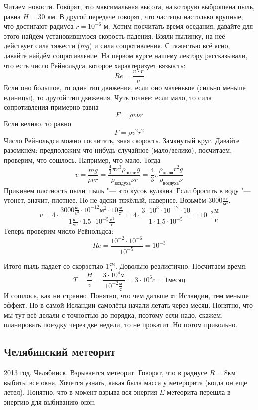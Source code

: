 Читаем новости.
Говорят, что максимальная высота, на которую выброшена пыль, равна $H=30$ км.
В другой передаче говорят, что частицы настолько крупные, что достигают радиуса $r=10^{-6}$ м.
Хотим посчитать время оседания, давайте для этого найдём установившуюся скорость падения.
Взяли пылинку, на неё действует сила тяжести ($mg$) и сила сопротивления.
С тяжестью всё ясно, давайте найдём сопротивление.
На первом курсе нашему лектору рассказывали, что есть число Рейнольдса, которое характеризует вязкость:
\[
Re = \frac{v \cdot r}{\nu}
\]
Если оно большое, то один тип движения, если оно маленькое (сильно меньше единицы), то другой тип движения.
Чуть точнее: если мало, то сила сопротивления примерно равна
\[ F=\rho v \nu r \]
Если велико, то равно
\[ F=\rho v^2 r^2 \]
Число Рейнольдса можно посчитать, зная скорость.
Замкнутый круг.
Давайте разомкнём: предположим что-нибудь случайное (мало/велико), посчитаем, проверим, что сошлось.
Например, что мало.
Тогда
\[ 
v
= \frac{mg}{\rho\nu r}
= \frac{\frac43\pi r^3 \rho_{\text{пыли}} g}{\rho_{\text{воздуха}} \nu r}
= \frac 43\pi \frac{\rho_{\text{пыли}} r^2 g}{\rho_{\text{воздуха}} \nu}
\]
Прикинем плотность пыли: пыль "--- это кусок вулкана.
Если бросить в воду "--- утонет, значит, плотнее.
Но не адски тяжёлый, наверное.
Возьмём $3000\frac{кг}{м^3}$.
\[
v
= 4 \cdot \frac{3000 \frac{кг}{v^3} \cdot 10^{-12} м^2 \cdot 10 \frac{м}{с^2}}{1 \frac{кг}{м^3} \cdot 1.5 \cdot 10^{-5} \frac{м^2}{с}}
= 4 \cdot \frac{3 \cdot 10^3 \cdot 10^{-12} \cdot 10}{1 \cdot 1.5 \cdot 10^{-5}}
= 10^{-2} \frac{м}{с}
\]
Теперь проверим число Рейнольдса:
\[
Re = \frac{10^{-2} \cdot 10^{-6}}{10^{-5}} = 10^{-3}
\]

Итого пыль падает со скоростью $1\frac{см}{с}$.
Довольно реалистично.
Посчитаем время:
\[
T = \frac{H}{v} = \frac{3 \cdot 10^4 м}{10^{-2} \frac{м}{с}} = 3 \cdot 10^6 c = 1 месяц
\]
И сошлось, как ни странно.
Понятно, что чем дальше от Исландии, тем меньше эффект.
Но в самой Исландии самолёты начали летать через месяц.
Понятно, что мы тут всё делали с точностью до порядка, поэтому если надо, скажем, планировать поездку через две недели, то не прокатит.
Но потом прикольно.

\subsection{Челябинский метеорит}
2013 год.
Челябинск.
Взрывается метеорит.
Говорят, что в радиусе $R=8 км$ выбиты все окна.
Хочется узнать, какая была масса у метерорита (когда он еще летел).
Понятно, что в момент взрыва вся энергия $E$ метеорита перешла в энергию для выбиванию окон.

